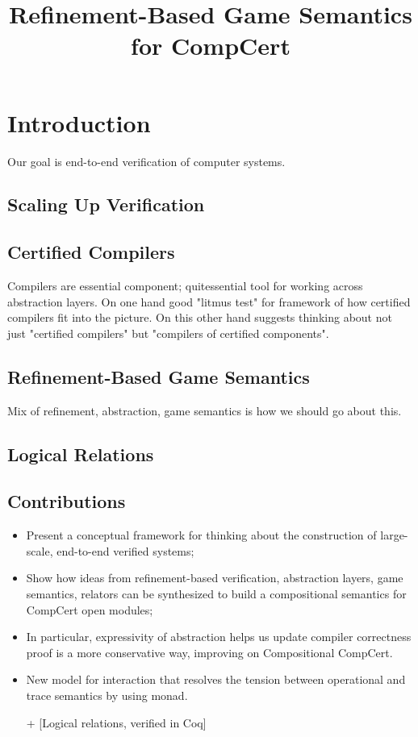 \documentclass{article}
\title{Refinement-Based Game Semantics for CompCert}
\begin{document}
\section{Introduction} %

Our goal is end-to-end verification of computer systems.

\subsection{Scaling Up Verification} %


\subsection{Certified Compilers} %

Compilers are essential component;
quitessential tool for working across abstraction layers.
On one hand good "litmus test" for framework
of how certified compilers fit into the picture.
On this other hand suggests thinking about not just
"certified compilers" but "compilers of certified components".


\subsection{Refinement-Based Game Semantics} %

Mix of refinement, abstraction, game semantics
is how we should go about this.


\subsection{Logical Relations} %


\subsection{Contributions} %

\begin{itemize}
\item Present a conceptual framework for thinking about
  the construction of large-scale, end-to-end verified systems;
\item Show how ideas from refinement-based verification,
  abstraction layers, game semantics, relators
  can be synthesized
  to build a compositional semantics for CompCert open modules;
\item In particular, expressivity of abstraction helps us
  update compiler correctness proof
  is a more conservative way,
  improving on Compositional CompCert.
\item New model for interaction that resolves the tension between
  operational and trace semantics
  by using monad.
\item[+] [Logical relations, verified in Coq]
\end{itemize}
\end{document}
